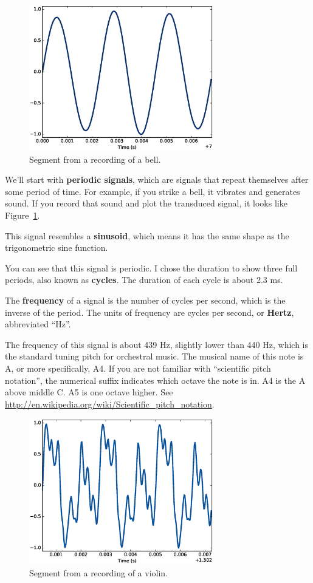 \documentclass[12pt]{book}
\begin{document}
\begin{figure}
\centerline{\includegraphics[height=2.5in]{figs/sounds1.eps}}
\caption{Segment from a recording of a bell.}
\label{fig.sounds1}
\end{figure}

We'll start with {\bf periodic signals}, which are signals that
repeat themselves after some period of time.  For example, if you
strike a bell, it vibrates and generates sound.  If you record
that sound and plot the transduced signal, it looks like
Figure~\ref{fig.sounds1}.

This signal resembles a {\bf sinusoid}, which means it has the same
shape as the trigonometric sine function.

You can see that this signal is periodic.  I chose the duration
to show three full periods, also known as {\bf cycles}.
The duration of each cycle is about 2.3 ms.

The {\bf frequency} of a signal is the number of cycles
per second, which is the inverse of the period.
The units of frequency are cycles per second, or {\bf Hertz},
abbreviated ``Hz''.

The frequency of this signal is about 439 Hz, slightly lower than 440
Hz, which is the standard tuning pitch for orchestral music.  The
musical name of this note is A, or more specifically, A4.  If you are
not familiar with ``scientific pitch notation'', the numerical suffix
indicates which octave the note is in.  A4 is the A above middle C.
A5 is one octave higher.  See
\url{http://en.wikipedia.org/wiki/Scientific_pitch_notation}.

\begin{figure}
\centerline{\includegraphics[height=2.5in]{figs/sounds2.eps}}
\caption{Segment from a recording of a violin.}
\label{fig.sounds2}
\end{figure}
\end{document}
